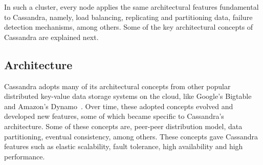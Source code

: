 In such a cluster,  every node applies the same architectural features
fundamental to Cassandra,  namely,  load balancing,  replicating
and partitioning data,  failure detection mechanisms, among others.  Some of the
key architectural concepts of Cassandra are explained next. 




\subsection{Architecture} \label{ss:Background-Cassandra-Archi}
Cassandra adopts many of its  architectural concepts from other popular
distributed key-value data storage systems on the cloud,  like Google's Bigtable
and Amazon's Dynamo~\citep{ycsb,Dynamo}.  Over time, these adopted concepts
evolved and developed new features,  some of which became specific to Cassandra's
architecture. Some of these  concepts are, peer-peer distribution model, data
partitioning, eventual consistency, among others. These  concepts gave Cassandra
  features such as elastic scalability,  fault tolerance, high availability and
high performance.

\vfill

